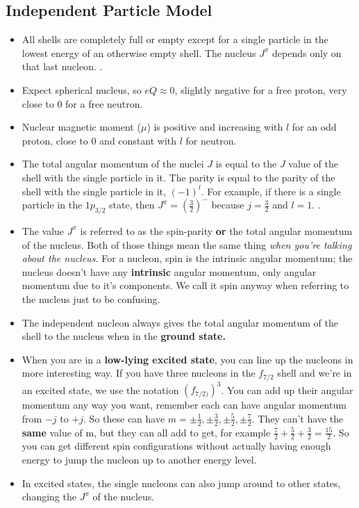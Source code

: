 \documentclass[letter]{article}
\begin{document}
\subsection{Independent Particle Model}
\begin{itemize}
\item All shells are completely full or empty except for a single
  particle in the lowest energy of an otherwise empty shell. The
  nucleus $J^\pi$ depends only on that last
  nucleon. \cite[Lec. 13-16]{lecture}.
\item Expect spherical nucleus, so $eQ \approx 0$, slightly negative
  for a free proton, very close to 0 for a free neutron.
\item Nuclear magnetic moment ($\mu$) is positive and increasing with
  $l$ for an odd proton, close to 0 and constant with $l$ for neutron.
\item The total angular momentum of the nuclei $J$ is equal to the
  $J$ value of the shell with the single particle in it. The parity
  is equal to the parity of the shell with the single particle in it,
  $(-1)^l$. For example, if there is a single particle in the
  $1p_{3/2}$ state, then $J^\pi=(\frac{3}{2})^{-}$ because
  $j=\frac{3}{2}$ and $l=1$. \cite[Lec. 13-16]{lecture}.
\item The value $J^\pi$ is referred to as the spin-parity \textbf{or}
  the total angular momentum of the nucleus. Both of those
  things mean the same thing \textit{when you're talking about the
    nucleus.} For a nucleon, spin is the intrinsic angular momentum;
  the nucleus doesn't have any \textbf{intrinsic} angular momentum,
  only angular momentum due to it's components. We call it spin anyway
  when referring to the nucleus just to be confusing.
\item The independent nucleon always gives the total angular momentum
  of the shell to the nucleus when in the \textbf{ground state.}
\item When you are in a \textbf{low-lying excited state}, you can line up the
  nucleons in more interesting way. If you have three nucleons in the
  $f_{7/2}$ shell and we're in an excited state, we use the notation
  $(f_{7/2)})^3$. You can add up their angular momentum any way you
  want, remember each can have angular momentum from $-j$ to $+j$. So
  these can have $m=\pm\frac{1}{2}, \pm\frac{3}{2}, \pm\frac{5}{2},
  \pm\frac{7}{2}$. They can't have the \textbf{same} value of m, but
  they can all add to get, for example
  $\frac{7}{2}+\frac{5}{2}+\frac{3}{2}=\frac{15}{2}$. So you can get
  different spin configurations without actually having enough energy
  to jump the nucleon up to another energy level.~\cite[pp. 149-151]{krane}
\item In excited states, the single nucleons can also jump around to
  other states, changing the $J^\pi$ of the nucleus.~\cite[Lec. 13-16]{lecture}
\end{itemize}
\end{document}
